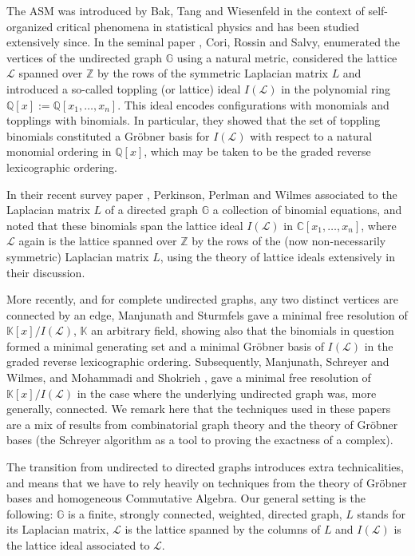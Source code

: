 \documentclass[ALCO]{cedram}
\newcommand{\mbz}{\mbox{$\mathbb{Z}$}}
\newcommand{\mbq}{\mbox{$\mathbb{Q}$}}
\newcommand{\mbc}{\mbox{$\mathbb{C}$}}
\newcommand{\mbk}{\mbox{$\mathbb{K}$}}
\newcommand{\mbg}{\mbox{$\mathbb{G}$}}
\newcommand{\mcl}{\mbox{$\mathcal{L}$}}
\begin{document}
The ASM was introduced by Bak, Tang and Wiesenfeld \cite{btw} in the
context of self-organized critical phenomena in statistical physics
and has been studied extensively since. In the seminal paper
\cite{crs}, Cori, Rossin and Salvy, enumerated the vertices of the
undirected graph $\mbg$ using a natural metric, considered the lattice
$\mcl$ spanned over $\mbz$ by the rows of the symmetric Laplacian
matrix $L$ and introduced a so-called toppling (or lattice) ideal
$I(\mcl)$ in the polynomial ring $\mbq[x]:=\mbq[x_1,\ldots
  ,x_n]$. This ideal encodes configurations with monomials and
topplings with binomials. In particular, they showed that the set of
toppling binomials constituted a Gr\"obner basis for $I(\mcl)$ with
respect to a natural monomial ordering in $\mbq[x]$, which may be
taken to be the graded reverse lexicographic ordering.

In their recent survey paper \cite{ppw}, Perkinson, Perlman and Wilmes
associated to the Laplacian matrix $L$ of a directed graph $\mbg$ a
collection of binomial equations, and noted that these binomials span
the lattice ideal $I(\mcl)$ in $\mbc[x_1,\ldots ,x_n]$, where $\mcl$
again is the lattice spanned over $\mbz$ by the rows of the (now
non-necessarily symmetric) Laplacian matrix $L$, using the theory of
lattice ideals extensively in their discussion.

More recently, and for complete undirected graphs, \ie any
two distinct vertices are connected by an edge, Manjunath and
Sturmfels \cite{ms} gave a minimal free resolution of
$\mbk[x]/I(\mcl)$, $\mbk$ an arbitrary field, showing also
that the binomials in question formed a minimal generating set and a
minimal Gr\"obner basis of $I(\mcl)$ in the graded reverse
lexicographic ordering. Subsequently, Manjunath, Schreyer and Wilmes\cite{msw}, and Mohammadi and Shokrieh \cite{mos}, gave a minimal free
resolution of $\mbk[x]/I(\mcl)$ in the case where the underlying
undirected graph was, more generally, connected. We remark here that
the techniques used in these papers are a mix of results from
combinatorial graph theory and the theory of Gr\"obner bases (\eg the
Schreyer algorithm as a tool to proving the exactness of a complex).

The transition from undirected to directed graphs introduces extra
technicalities, and means that we have to rely heavily on techniques
from the theory of Gr\"obner bases and homogeneous Commutative
Algebra. Our general setting is the following: $\mbg$ is a finite,
strongly connected, weighted, directed graph, $L$ stands for its
Laplacian matrix, $\mcl$ is the lattice spanned by the columns of $L$
and $I(\mcl)$ is the lattice ideal associated to $\mcl$.
\end{document}
